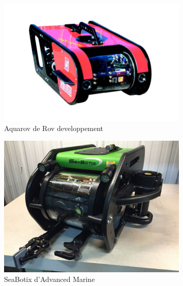 \documentclass[a4paper,11pt]{report}
\begin{document}
					\begin{figure}[!h]
						\centering
							\begin{subfigure}[b]{0.3\textwidth}
								\includegraphics[width=\textwidth]{Photos/produit-aquarov.jpg}
								\caption{Aquarov de Rov developpement}
							\end{subfigure}
							\begin{subfigure}[b]{0.3\textwidth}
								\includegraphics[width=\textwidth]{Photos/SeaBotix_LBV_300-1.jpg}
								\caption{SeaBotix d'Advanced Marine}
							\end{subfigure}
							\begin{subfigure}[b]{0.3\textwidth}

\end{subfigure}
\end{figure}
\end{document}
